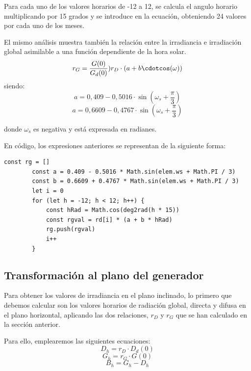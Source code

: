 Para cada uno de los valores horarios de -12 a 12, se calcula el angulo horario multiplicando por 15 grados y se introduce en la ecuación, obteniendo 24 valores por cada uno de los meses.

El mismo análisis muestra también la relación entre la irradiancia e irradiación global asimilable a una función dependiente de la hora solar.
\begin{equation}
r_G = \frac{G(0)}{G_d(0)} ) r_D\cdot(a+b\cdotcos(\omega))
\end{equation}
siendo:
\begin{equation}
a=0,409 - 0,5016\cdot\sin(\omega_s+\frac{\pi}{3})
\end{equation}
\begin{equation}
a=0,6609 - 0,4767\cdot\sin(\omega_s+\frac{\pi}{3})
\end{equation}

donde $\omega_s$ es negativa y está expresada en radianes.

En código, los expresiones anteriores se representan de la siguiente forma:
\begin{lstlisting}[style=ES6, caption={Cálculo de rG}]
		const rg = []
		const a = 0.409 - 0.5016 * Math.sin(elem.ws + Math.PI / 3)
		const b = 0.6609 + 0.4767 * Math.sin(elem.ws + Math.PI / 3)
		let i = 0
		for (let h = -12; h < 12; h++) {
			const hRad = Math.cos(deg2rad(h * 15))
			const rgval = rd[i] * (a + b * hRad)
			rg.push(rgval)
			i++
		}
\end{lstlisting}

\subsection{Transformación al plano del generador}
\label{section:3.5.2}

Para obtener los valores de irradiancia en el plano inclinado, lo primero que debemos calcular son los valores horarios de radiación global, directa y difusa en el plano horizontal, aplicando las dos relaciones, $r_D$ y $r_G$ que se han calculado en la sección anterior.

Para ello, emplearemos las siguientes ecuaciones:
\begin{equation}
D_h = r_D \cdot D_d(0)
\end{equation}
\begin{equation}
G_h = r_G \cdot G(0)
\end{equation}
\begin{equation}
B_h = G_h - D_h
\end{equation}

